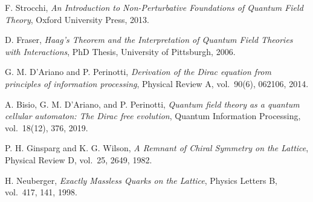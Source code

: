 \documentclass[11pt]{article}
\theoremstyle{definition}
\theoremstyle{remark}
\begin{document}
\begin{thebibliography}{99}
F. Strocchi,
\textit{An Introduction to Non-Perturbative Foundations of Quantum Field Theory},
Oxford University Press, 2013.

D. Fraser,
\textit{Haag's Theorem and the Interpretation of Quantum Field Theories with Interactions},
PhD Thesis, University of Pittsburgh, 2006.

G. M. D'Ariano and P. Perinotti,
\textit{Derivation of the Dirac equation from principles of information processing},
Physical Review A, vol.~90(6), 062106, 2014.

A. Bisio, G. M. D'Ariano, and P. Perinotti,
\textit{Quantum field theory as a quantum cellular automaton: The Dirac free evolution},
Quantum Information Processing, vol.~18(12), 376, 2019.

P. H. Ginsparg and K. G. Wilson,
\textit{A Remnant of Chiral Symmetry on the Lattice},
Physical Review D, vol.~25, 2649, 1982.

H. Neuberger,
\textit{Exactly Massless Quarks on the Lattice},
Physics Letters B, vol.~417, 141, 1998.

\end{thebibliography}
\end{document}
